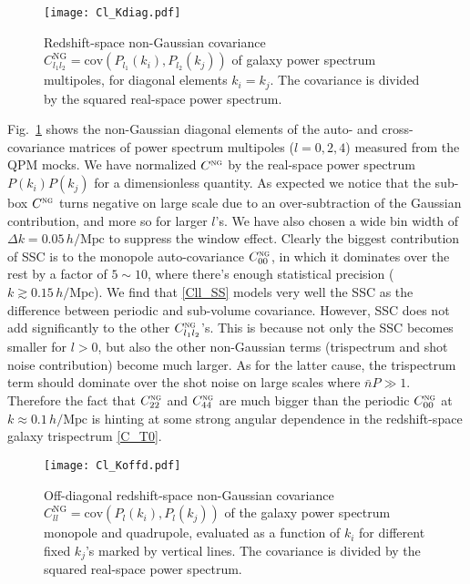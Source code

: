 \documentclass[a4paper,11pt]{article}
\newcommand{\nbar}{\bar{n}}
\newcommand{\Mpc}{\mathrm{Mpc}}
\newcommand{\hMpc}{{\,h/\Mpc}}
\newcommand{\nonGauss}{\textsc{ng}}
\begin{document}
\begin{figure}[tbp]
    \centering
    \texttt{[image: Cl\_Kdiag.pdf]}
    \caption{Redshift-space non-Gaussian covariance 
    $C^\mathrm{NG}_{l_1l_2}=\mathrm{cov}(P_{l_1}(k_i),P_{l_2}(k_j))$ 
    of galaxy power spectrum
    multipoles, for diagonal elements $k_i=k_j$.
    The covariance is divided by the squared real-space power
    spectrum.
    }
    \label{fig:Cl_Kdiag}
\end{figure}

Fig.~\ref{fig:Cl_Kdiag} shows the non-Gaussian diagonal elements of the auto-
and cross-covariance matrices of power spectrum multipoles ($l=0,2,4$) measured
from the QPM mocks.
We have normalized $C^\nonGauss$ by the real-space power spectrum
$P(k_i)P(k_j)$ for a dimensionless quantity.
As expected we notice that the sub-box $C^\nonGauss$ turns negative on large
scale due to an over-subtraction of the Gaussian contribution, and more so for
larger $l$'s.
We have also chosen a wide bin width of $\Delta k=0.05\hMpc$ to suppress
the window effect.
Clearly the biggest contribution of SSC is to the monopole auto-covariance
$C^\nonGauss_{00}$, in which it dominates over the rest by a factor of
$5\sim10$, where there's enough statistical precision ($k\gtrsim0.15\hMpc$).
We find that \eqref{Cll_SS} models very well the SSC as the difference between periodic
and sub-volume covariance.
However, SSC does not add significantly to the other $C^\nonGauss_{l_1l_2}$'s.
This is because not only the SSC becomes smaller for $l>0$, but also the other
non-Gaussian terms (trispectrum and shot noise contribution) become much
larger.
As for the latter cause, the trispectrum term should dominate over the shot
noise on large scales where $\nbar P\gg1$.
Therefore the fact that $C^\nonGauss_{22}$ and $C^\nonGauss_{44}$ are much
bigger than the periodic $C^\nonGauss_{00}$ at $k\approx0.1\hMpc$ is hinting at
some strong angular dependence in the redshift-space galaxy trispectrum
\eqref{C_T0}.

\begin{figure}[tbp]
    \centering
    \texttt{[image: Cl\_Koffd.pdf]}
    \caption{Off-diagonal redshift-space non-Gaussian covariance
      $C^\mathrm{NG}_{ll}=\mathrm{cov}(P_{l}(k_i),P_{l}(k_j))$ 
    of the galaxy power spectrum
    monopole and quadrupole, evaluated as a function of $k_i$ for different 
    fixed $k_j$'s marked by vertical lines.
    The covariance is divided by the squared real-space power
    spectrum.
    }
    \label{fig:Cl_Koffd}
\end{figure}
\end{document}
